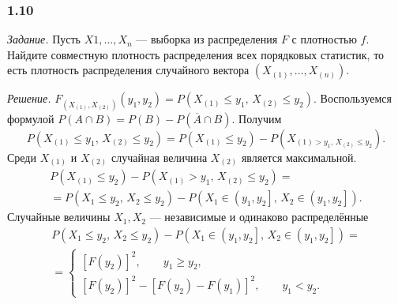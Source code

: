 \subsubsection{1.10}

\textit{Задание.} Пусть $X1, \dotsc, X_n$ --- выборка из распределения $F$ с плотностью $f$.
Найдите совместную плотность распределения всех порядковых статистик,
то есть плотность распределения случайного вектора
$ \left( X_{ \left( 1 \right) }, \dotsc, X_{ \left( n \right) } \right) $.

\textit{Решение.}
$F_{ \left( X_{ \left( 1 \right) }, X_{ \left( 2 \right) } \right) } \left( y_1, y_2 \right) =
  P \left( X_{ \left( 1 \right) } \leq y_1, \, X_{ \left( 2 \right) } \leq y_2 \right)$.
Воспользуемся формулой
$P \left( A \cap B \right) =
  P \left( B \right) - P \left( \overline{A} \cap B \right) $.
Получим
$$P \left( X_{ \left( 1 \right) } \leq y_1, \, X_{ \left( 2 \right) } \leq y_2 \right) =
  P \left( X_{ \left( 1 \right) } \leq y_2 \right) -
  P \left( X_{ \left( 1 \right) > y_1, \, X_{ \left( 2 \right) } \leq y_2} \right).$$
Среди $X_{ \left( 1 \right) }$ и $X_{ \left( 2 \right) }$ случайная величина
$X_{ \left( 2 \right) }$ является максимальной.
\begin{equation*}
  \begin{split}
    P \left( X_{ \left( 1 \right) } \leq y_2 \right) -
    P \left( X_{ \left( 1 \right) } > y_1, \, X_{ \left( 2 \right) } \leq y_2 \right) = \\
    = P \left( X_1 \leq y_2, \, X_2 \leq y_2 \right) -
    P \left( X_1 \in \left( y_1, y_2 \right], \, X_2 \in \left( y_1, y_2 \right] \right).
  \end{split}
\end{equation*}
Случайные величины $X_1, X_2$ --- независимые и одинаково распределённые
\begin{equation*}
  \begin{split}
    P \left( X_1 \leq y_2, \, X_2 \leq y_2 \right) -
    P \left( X_1 \in \left( y_1, y_2 \right], \, X_2 \in \left( y_1, y_2 \right] \right) = \\
    = \begin{cases}
      \left[ F \left( y_2 \right) \right]^2, \qquad y_1 \geq y_2, \\
      \left[ F \left( y_2 \right) \right]^2 -
      \left[ F \left( y_2 \right) - F \left( y_1 \right) \right]^2, \qquad y_1 < y_2.
    \end{cases}
\end{split}
\end{equation*}

